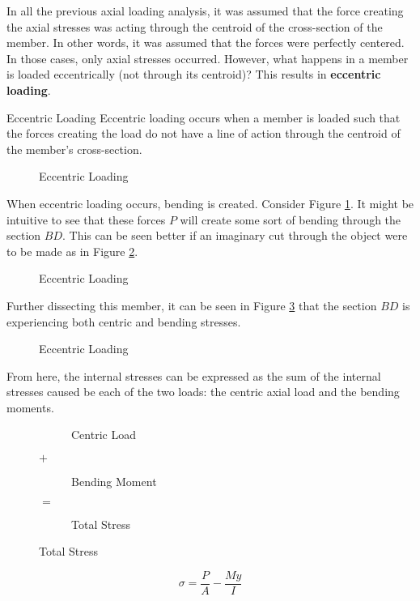 \documentclass[12pt]{article}
\begin{document}
In all the previous axial loading analysis, it was assumed that the force creating the axial stresses was acting through the centroid of the cross-section of the member. In other words, it was assumed that the forces were perfectly centered. In those cases, only axial stresses occurred. However, what happens in a member is loaded eccentrically (not through its centroid)? This results in \textbf{eccentric loading}.
\begin{definition}{Eccentric Loading}
  Eccentric loading occurs when a member is loaded such that the forces creating the load do not have a line of action through the centroid of the member's cross-section.
\end{definition}
\begin{figure}[H]
  \centering
  
  \caption{Eccentric Loading}
  \label{fig:066}
\end{figure}
When eccentric loading occurs, bending is created. Consider Figure \ref{fig:066}. It might be intuitive to see that these forces $P$ will create some sort of bending through the section $BD$. This can be seen better if an imaginary cut through the object were to be made as in Figure \ref{fig:067}.
\begin{figure}[H]
  \centering
  
  \caption{Eccentric Loading}
  \label{fig:067}
\end{figure}
Further dissecting this member, it can be seen in Figure \ref{fig:068} that the section $BD$ is experiencing both centric and bending stresses.
\begin{figure}[H]
  \centering
  
  \caption{Eccentric Loading}
  \label{fig:068}
\end{figure}
From here, the internal stresses can be expressed as the sum of the internal stresses caused be each of the two loads: the centric axial load and the bending moments.
\begin{figure}[H]
  \centering
  \begin{subfigure}[H]{0.3\textwidth}
    \centering
    
    \caption{Centric Load}
    \label{fig:069}
  \end{subfigure}
  {\Large \textbf{$+$}}
  \begin{subfigure}[H]{0.3\textwidth}
    \centering
    
    \caption{Bending Moment}
    \label{fig:070}
  \end{subfigure}
  {\Large \textbf{$=$}}
  \begin{subfigure}[H]{0.3\textwidth}
    \centering
    
    \caption{Total Stress}
    \label{fig:071}
  \end{subfigure}
\end{figure}
\begin{equation*}
  \sigma = \frac{P}{A} - \frac{My}{I}
\end{equation*}
\end{document}
